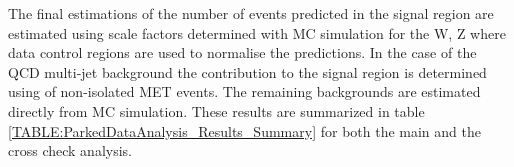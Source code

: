 
The final estimations of the number of events predicted in the signal region are estimated using scale factors determined with \gls{MC} simulation for the W, Z where data control regions are used to normalise the predictions. In the case of the \gls{QCD} multi-jet background the contribution to the signal region is determined using of non-isolated \gls{MET} events. The remaining backgrounds are estimated directly from \gls{MC} simulation. These results are summarized in table \ref{TABLE:ParkedDataAnalysis_Results_Summary} for both the main and the cross check analysis.





